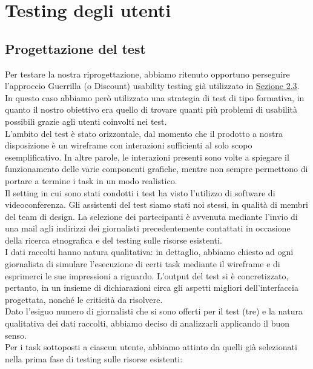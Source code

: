 \section{Testing degli utenti}
\label{s:testing-utenti}

\subsection{Progettazione del test}
\label{ss:vd-progettazione-test}
Per testare la nostra riprogettazione, abbiamo ritenuto opportuno perseguire l'approccio Guerrilla (o Discount) usability testing già utilizzato in \hyperref[s:verifica-risorse-esistenti-testing-utenti]{Sezione 2.3}.\\
In questo caso abbiamo però utilizzato una strategia di test di tipo formativa, in quanto il nostro obiettivo era quello di trovare quanti più problemi di usabilità possibili grazie agli utenti coinvolti nei test.\\
L'ambito del test è stato orizzontale, dal momento che il prodotto a nostra disposizione è un wireframe con interazioni sufficienti al solo scopo esemplificativo. In altre parole, le interazioni presenti sono volte a spiegare il funzionamento delle varie componenti grafiche, mentre non sempre permettono di portare a termine i task in un modo realistico.\\
Il setting in cui sono stati condotti i test ha visto l'utilizzo di software di videoconferenza. Gli assistenti del test siamo stati noi stessi, in qualità di membri del team di design. La selezione dei partecipanti è avvenuta mediante l'invio di una mail agli indirizzi dei giornalisti precedentemente contattati in occasione della ricerca etnografica e del testing sulle risorse esistenti.\\
I dati raccolti hanno natura qualitativa: in dettaglio, abbiamo chiesto ad ogni giornalista di simulare l'esecuzione di certi task mediante il wireframe e di esprimerci le sue impressioni a riguardo. L'output del test si è concretizzato, pertanto, in un insieme di dichiarazioni circa gli aspetti migliori dell'interfaccia progettata, nonché le criticità da risolvere.\\
Dato l'esiguo numero di giornalisti che si sono offerti per il test (tre) e la natura qualitativa dei dati raccolti, abbiamo deciso di analizzarli applicando il buon senso.\\
Per i task sottoposti a ciascun utente, abbiamo attinto da quelli già selezionati nella prima fase di testing sulle risorse esistenti:

